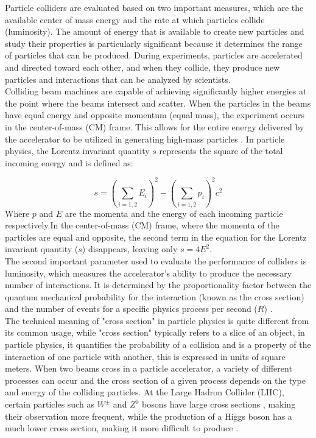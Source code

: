 Particle colliders are evaluated based on two important measures, which are the available center of mass energy and the rate at which particles collide (luminosity). The amount of energy that is available to create new particles and study their properties is particularly significant because it determines the range of particles that can be produced. During experiments, particles are accelerated and directed toward each other, and when they collide, they produce new particles and interactions that can be analyzed by scientists.\\

Colliding beam machines are capable of achieving significantly higher energies at the point where the beams intersect and scatter. When the particles in the beams have equal energy and opposite momentum (equal mass), the experiment occurs in the center-of-mass (CM) frame. This allows for the entire energy delivered by the accelerator to be utilized in generating high-mass particles \cite{undergraduate_accelerators_chapter}. In particle physics, the Lorentz invariant quantity $s$ represents the square of the total incoming energy and is defined as:

\begin{equation}
s = \left ( \sum_{i = 1,2}^{}E_{i} \right )^{2}-\left ( \sum_{i = 1,2}^{}p_{i} \right )^{2}c^{2}
\end{equation}
Where  \textbf{$p$} and $E$ are the momenta and the energy of each incoming particle respectively.In the center-of-mass (CM) frame, where the momenta of the particles are equal and opposite, the second term in the equation for the Lorentz invariant quantity ($s$) disappears, leaving only $s = 4E^2$.\\

The second important parameter used to evaluate the performance of colliders is luminosity, which measures the accelerator's ability to produce the necessary number of interactions. It is determined by the proportionality factor between the quantum mechanical probability for the interaction (known as the cross section) and the number of events for a specific physics process per second ($R$) \cite{ref_lib_vol3}.\\

The technical meaning of "cross section" in particle physics is quite different from its common usage, while "cross section" typically refers to a slice of an object, in particle physics, it quantifies the probability of a collision and is a property of the interaction of one particle with another, this is expressed in units of square meters. When two beams cross in a particle accelerator, a variety of different processes can occur and  the cross section of a given process depends on the type and energy of the colliding particles.
At the Large Hadron Collider (LHC), certain particles such as  $W^{\pm}$ and $Z^{0}$ bosons have large cross sections , making their observation more frequent, while the production of a Higgs boson has a much lower cross section, making it more difficult to produce \cite{thomson_2013}.\\

